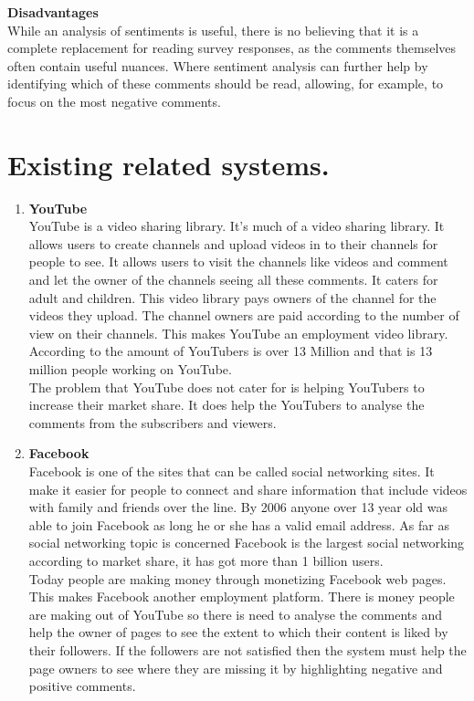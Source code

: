 \documentclass[12pt]{report}
\begin{document}
\textbf{Disadvantages}\\
While an analysis of sentiments is useful, there is no believing that it is a complete replacement for reading survey responses, as the comments themselves often contain useful nuances. Where sentiment analysis can further help by identifying which of these comments should be read, allowing, for example, to focus on the most negative comments.


\section{Existing related systems.}
\begin{enumerate}
	
	\item \textbf{YouTube}\\
	YouTube is a video sharing library. It’s much of a video sharing library. It allows users to create channels and upload videos in to their channels for people to see. It allows users to visit the channels like videos and comment and let the owner of the channels seeing all these comments. It caters for adult and children. This video library pays owners of the channel for the videos they upload. The channel owners are paid according to the number of view on their channels. This makes YouTube an employment video library. According to \citep{bartl2018youtube} the amount of YouTubers is over 13 Million and that is 13 million people working on YouTube.\\
	
	The problem that YouTube does not cater for is helping YouTubers to increase their market share. It does help the YouTubers to analyse the comments from the subscribers and viewers.
	
	\item \textbf{Facebook}\\
	Facebook is one of the sites that can be called social networking sites. It make it easier for people to connect and share information that include videos with family and friends over the line. By 2006 anyone over 13 year old was able to join Facebook as long he or she has a valid email address. As far as social networking topic is concerned Facebook is the largest social networking according to market share, it has got more than 1 billion users. \\
	Today people are making money through monetizing Facebook web pages. This makes Facebook another employment platform. There is money people are making out of YouTube so there is need to analyse the comments and help the owner of pages to see the extent to which their content is liked by their followers. If the followers are not satisfied then the system must help the page owners to see where they are missing it by highlighting negative and positive comments.
	

\end{enumerate}
\end{document}
